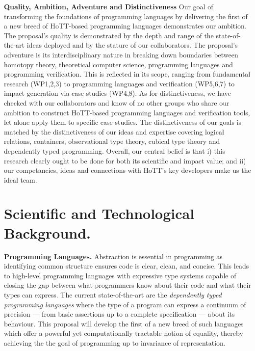 \documentclass[a4paper,11pt]{article}
\begin{document}
  {\bf Quality, Ambition, Adventure and Distinctiveness} Our goal of
  transforming the foundations of programming languages by delivering
  the first of a new breed of HoTT-based programming languages
  demonstrates our ambition. The proposal's quality is demonstrated by
  the depth and range of the state-of-the-art ideas deployed and by
  the stature of our collaborators. The proposal's adventure is its
  interdisciplinary nature in breaking down boundaries between
  homotopy theory, theoretical computer science, programming languages
  and programming verification. This is reflected in its scope,
  ranging from fundamental research (WP1,2,3) to programming languages
  and verification (WP5,6,7) to impact generation via case studies
  (WP4,8). As for distinctiveness, we have checked with our
  collaborators and know of no other groups who share our ambition to
  construct HoTT-based programming languages and verification tools,
  let alone apply them to specific case studies. The distinctiveness
  of our goals is matched by the distinctiveness of our ideas and
  expertise covering logical relations, containers, observational type
  theory, cubical type theory and dependently typed
  programming. Overall, our central belief is that i) this research
  clearly ought to be done for both its scientific and impact value;
  and ii) our competancies, ideas and connections with HoTT's key
  developers make us the ideal team.



\vspace*{-0.1in} 



\vspace*{-0.1in} 
\section{Scientific and Technological Background.}
\vspace*{-0.1in} 

{\bf Programming Languages.} Abstraction is essential in programming
as identifying common structure ensures code is clear, clean, and
concise. This leads to high-level programming languages with
expressive type systems capable of closing the gap between what
programmers know about their code and what their types can express.
The current state-of-the-art are the {\em dependently typed
  programming languages} where the type of a program can express a
continuum of precision --- from basic assertions up to a complete
specification --- about its behaviour. This proposal will develop the
first of a new breed of such languages which offer a powerful yet
computationally tractable notion of equality, thereby achieving the
the goal of programming up to invariance of representation.
\end{document}
